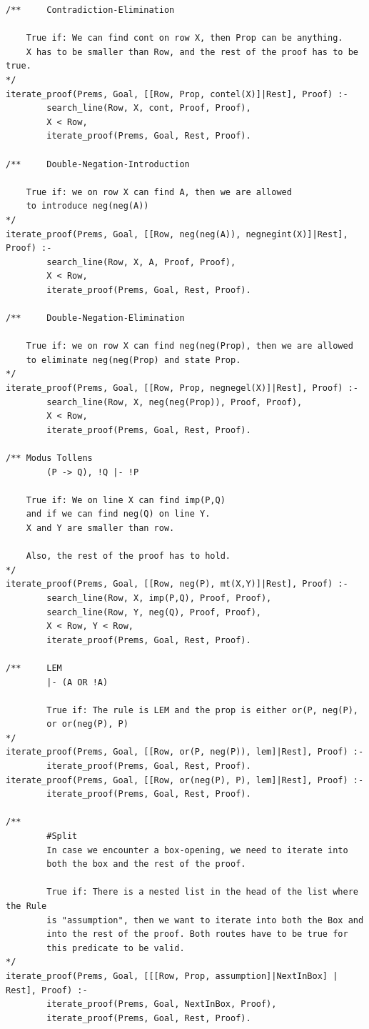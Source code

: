 \documentclass[a4paper]{article}
\begin{document}
\begin{verbatim}
/**     Contradiction-Elimination

	True if: We can find cont on row X, then Prop can be anything.
	X has to be smaller than Row, and the rest of the proof has to be true.
*/
iterate_proof(Prems, Goal, [[Row, Prop, contel(X)]|Rest], Proof) :-
        search_line(Row, X, cont, Proof, Proof),
        X < Row,
        iterate_proof(Prems, Goal, Rest, Proof).

/**     Double-Negation-Introduction

	True if: we on row X can find A, then we are allowed 
	to introduce neg(neg(A))
*/
iterate_proof(Prems, Goal, [[Row, neg(neg(A)), negnegint(X)]|Rest], Proof) :-
        search_line(Row, X, A, Proof, Proof),
        X < Row,
        iterate_proof(Prems, Goal, Rest, Proof).

/**     Double-Negation-Elimination

	True if: we on row X can find neg(neg(Prop), then we are allowed
	to eliminate neg(neg(Prop) and state Prop.
*/
iterate_proof(Prems, Goal, [[Row, Prop, negnegel(X)]|Rest], Proof) :-
        search_line(Row, X, neg(neg(Prop)), Proof, Proof),
        X < Row,
        iterate_proof(Prems, Goal, Rest, Proof).

/** Modus Tollens
        (P -> Q), !Q |- !P
        
	True if: We on line X can find imp(P,Q) 
	and if we can find neg(Q) on line Y.
	X and Y are smaller than row. 
     
	Also, the rest of the proof has to hold.    
*/
iterate_proof(Prems, Goal, [[Row, neg(P), mt(X,Y)]|Rest], Proof) :-
        search_line(Row, X, imp(P,Q), Proof, Proof),
        search_line(Row, Y, neg(Q), Proof, Proof),
        X < Row, Y < Row,
        iterate_proof(Prems, Goal, Rest, Proof).

/**     LEM
        |- (A OR !A)
        
        True if: The rule is LEM and the prop is either or(P, neg(P),
        or or(neg(P), P)
*/
iterate_proof(Prems, Goal, [[Row, or(P, neg(P)), lem]|Rest], Proof) :-
        iterate_proof(Prems, Goal, Rest, Proof).
iterate_proof(Prems, Goal, [[Row, or(neg(P), P), lem]|Rest], Proof) :-
        iterate_proof(Prems, Goal, Rest, Proof).

/**
        #Split
        In case we encounter a box-opening, we need to iterate into 
        both the box and the rest of the proof.
        
        True if: There is a nested list in the head of the list where the Rule
        is "assumption", then we want to iterate into both the Box and
        into the rest of the proof. Both routes have to be true for
        this predicate to be valid.
*/
iterate_proof(Prems, Goal, [[[Row, Prop, assumption]|NextInBox] | Rest], Proof) :-
        iterate_proof(Prems, Goal, NextInBox, Proof),
        iterate_proof(Prems, Goal, Rest, Proof).


\end{verbatim}
\end{document}

